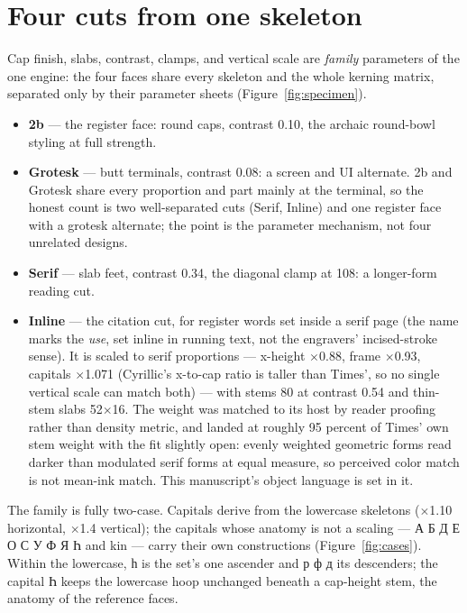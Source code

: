 \documentclass[12pt]{article}
\newcommand{\cz}[1]{{\chu #1}}
\begin{document}
\section{Four cuts from one skeleton}\label{sec:cuts}

Cap finish, slabs, contrast, clamps, and vertical scale are \emph{family} parameters of the one engine: the four faces share every skeleton and the whole kerning matrix, separated only by their parameter sheets (Figure~\ref{fig:specimen}).

\begin{itemize}
\item \textbf{2b} — the register face: round caps, contrast 0.10, the archaic round-bowl styling at full strength.
\item \textbf{Grotesk} — butt terminals, contrast 0.08: a screen and UI alternate. 2b and Grotesk share every proportion and part mainly at the terminal, so the honest count is two well-separated cuts (Serif, Inline) and one register face with a grotesk alternate; the point is the parameter mechanism, not four unrelated designs.
\item \textbf{Serif} — slab feet, contrast 0.34, the diagonal clamp at 108: a longer-form reading cut.
\item \textbf{Inline} — the citation cut, for register words set inside a serif page (the name marks the \emph{use}, set inline in running text, not the engravers' incised-stroke sense). It is scaled to serif proportions — x-height $\times$0.88, frame $\times$0.93, capitals $\times$1.071 (Cyrillic's x-to-cap ratio is taller than Times', so no single vertical scale can match both) — with stems 80 at contrast 0.54 and thin-stem slabs 52$\times$16. The weight was matched to its host by reader proofing rather than density metric, and landed at roughly 95 percent of Times' own stem weight with the fit slightly open: evenly weighted geometric forms read darker than modulated serif forms at equal measure, so perceived color match is not mean-ink match. This manuscript's object language is set in it.
\end{itemize}

The family is fully two-case. Capitals derive from the lowercase skeletons ($\times$1.10 horizontal, $\times$1.4 vertical); the capitals whose anatomy is not a scaling — \cz{А Б Д Е О С У Ф Я Һ} and kin — carry their own constructions (Figure~\ref{fig:cases}). Within the lowercase, \cz{һ} is the set's one ascender and \cz{р ф д} its descenders; the capital \cz{Һ} keeps the lowercase hoop unchanged beneath a cap-height stem, the anatomy of the reference faces.
\end{document}
